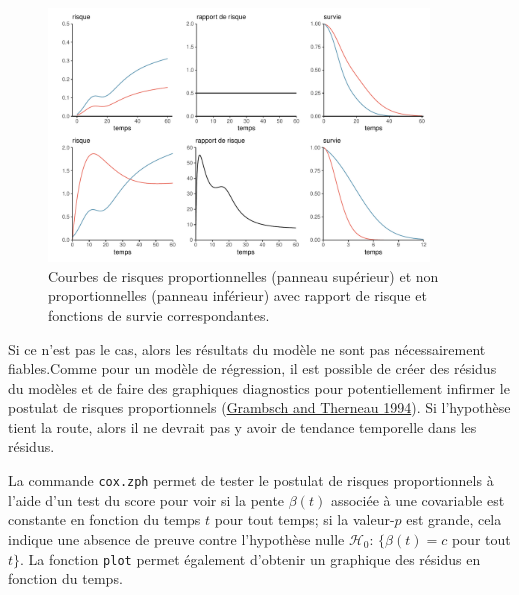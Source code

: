 \documentclass[
  11pt,
  letterpaper,
]{scrbook}
\theoremstyle{definition}
\theoremstyle{remark}
\begin{document}
\begin{figure}[ht!]

{\centering \includegraphics[width=0.9\textwidth,height=\textheight]{survie_files/figure-pdf/fig-risquepropfig-1.pdf}

}

\caption{\label{fig-risquepropfig}Courbes de risques proportionnelles
(panneau supérieur) et non proportionnelles (panneau inférieur) avec
rapport de risque et fonctions de survie correspondantes.}

\end{figure}

Si ce n'est pas le cas, alors les résultats du modèle ne sont pas
nécessairement fiables.Comme pour un modèle de régression, il est
possible de créer des résidus du modèles et de faire des graphiques
diagnostics pour potentiellement infirmer le postulat de risques
proportionnels (\protect\hyperlink{ref-Grambsch.Therneau:1994}{Grambsch
and Therneau 1994}). Si l'hypothèse tient la route, alors il ne devrait
pas y avoir de tendance temporelle dans les résidus.

La commande \texttt{cox.zph} permet de tester le postulat de risques
proportionnels à l'aide d'un test du score pour voir si la pente
\(\beta(t)\) associée à une covariable est constante en fonction du
temps \(t\) pour tout temps; si la valeur-\(p\) est grande, cela indique
une absence de preuve contre l'hypothèse nulle \(\mathscr{H}_0\):
\(\{\beta(t)=c\) pour tout \(t\}\). La fonction \texttt{plot} permet
également d'obtenir un graphique des résidus en fonction du temps.
\end{document}
